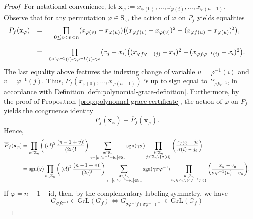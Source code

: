 \begin{proof}
For notational convenience, let $\mathbf{x}_{\varphi}:=x_{\varphi(0)},\ldots,x_{\varphi(i)},\ldots,x_{\varphi(n-1)}$. Observe that for any permutation $\varphi\in \text{S}_n$, the action of $\varphi$ on $P_f$ yields equalities
 \[
 \begin{array}{ccc}
P_{f}({\bf x}_{\varphi}) & = & \underset{0\le u<v<n}{\prod}(x_{\varphi(v)}-x_{\varphi(u)})\big((x_{\varphi f(v)}-x_{\varphi(v)})^{2}-(x_{\varphi f(u)}-x_{\varphi(u)})^{2}\big),\\
\\
 & = & \underset{0\le\varphi^{-1}(i)<\varphi^{-1}(j)<n}{\prod}(x_{j}-x_{i})\big((x_{\varphi f\varphi^{-1}(j)}-x_{j})^{2}-(x_{\varphi f\varphi^{-1}(i)}-x_{i})^{2}\big).
\end{array}
 \]
 The last equality above features the indexing change of variable $u=\varphi^{-1}(i)$ and $v=\varphi^{-1}(j)$. Thus, $P_{f}(x_{\varphi(0)},\ldots,x_{\varphi(n-1)})$ is up to sign equal to $P_{\varphi f\varphi^{-1}}$, in accordance with Definition \ref{defn:polynomial-grace-definition}. Furthermore, by the proof of Proposition \ref{prop:polynomial-grace-certificate}, the action of $\varphi$
on $P_{f}$ yields the congruence identity
\[
P_{f}(\mathbf{x}_{\varphi})\equiv \overline{P}_f(\mathbf{x}_{\varphi}).
\]
Hence,
\begin{align*}
    \overline{P}_f({\bf x}_{\varphi})	& =\prod_{v\in\mathbb{Z}_{n}}\bigg(\left(v!\right)^{2}\frac{\left(n-1+v\right)!}{\left(2v\right)!}\bigg)\sum_{\substack{\sigma\in\text{S}_{n}\\
\gamma=\left|\sigma f\sigma^{-1}-\text{id}\right|\in\text{S}_{n}
}
}\text{sgn}(\gamma\sigma)\prod_{\substack{i\in\mathbb{Z}_{n}\\
j_{i}\in\mathbb{Z}_{n}\backslash\{\sigma(i)\}
}
}\bigg(\frac{x_{\varphi(i)}-j_{i}}{\sigma(i)-j_{i}}\bigg).\\
	&=\text{sgn}(\varphi)\prod_{v\in\mathbb{Z}_{n}}\bigg(\left(v!\right)^{2}\frac{\left(n-1+v\right)!}{\left(2v\right)!}\bigg)\sum_{\substack{\sigma\in\text{S}_{n}\\
\gamma=\left|\sigma f\sigma^{-1}-\text{id}\right|\in\text{S}_{n}
}
}\text{sgn}(\gamma\sigma\varphi^{-1})\prod_{\substack{u\in\mathbb{Z}_{n}\\
v_{u}\in\mathbb{Z}_{n}\backslash\{\sigma\varphi^{-1}(u)\}
}
}\bigg(\frac{x_{u}-v_{u}}{\sigma\varphi^{-1}(u)-v_{u}}\bigg).
\end{align*}
If $\varphi=n-1-\text{id}$, then,
by the complementary labeling symmetry, we have 
\[
G_{\sigma f\sigma^{-1}}\in\text{GrL}\left(G_{f}\right)\Longleftrightarrow G_{\sigma\varphi^{-1}f(\sigma\varphi^{-1})^{-1}}\in\text{GrL}\left(G_{f}\right)
\]
\end{proof}
